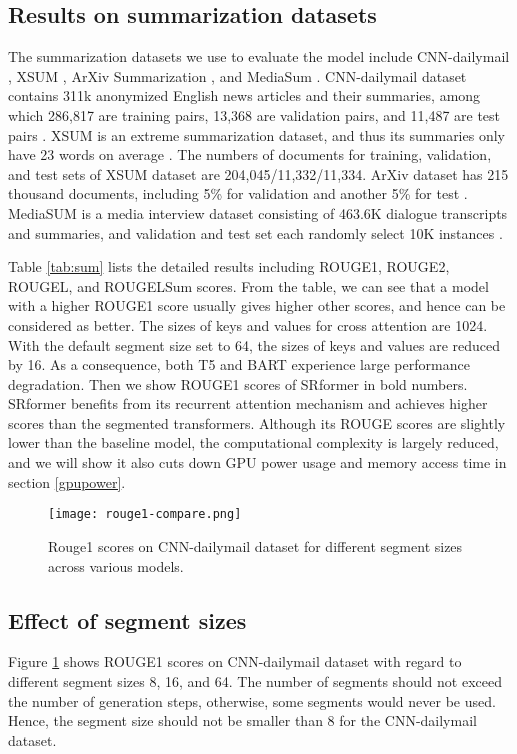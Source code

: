 \documentclass[11pt]{article}
\begin{document}
\subsection{Results on summarization datasets}
The summarization datasets we use to evaluate the model include CNN-dailymail \citep{nallapati-etal-2016-abstractive}, XSUM \citep{xsum-emnlp}, ArXiv Summarization \citep{arxiv-sum}, and MediaSum \citep{zhu-etal-2021-mediasum}. CNN-dailymail dataset contains 311k anonymized English news articles and their summaries, among which 286,817 are training pairs, 13,368 are validation pairs, and 11,487 are test pairs \citep{CNN-qa, see-etal-2017-get}. XSUM is an extreme summarization dataset, and thus its summaries only have 23 words on average \cite{xsum-emnlp}. The numbers of documents for training, validation, and test sets of XSUM dataset are 204,045/11,332/11,334. ArXiv dataset has 215 thousand documents, including 5\% for validation and another 5\% for test \cite{arxiv-sum}. MediaSUM is a media interview dataset consisting of 463.6K dialogue transcripts and summaries, and  validation and test set each randomly select 10K instances \cite{zhu-etal-2021-mediasum}.

 Table \ref{tab:sum} lists the detailed results including ROUGE1, ROUGE2, ROUGEL, and ROUGELSum scores. From the table, we can see that a model with a higher ROUGE1 score usually gives higher other scores, and hence can be considered as better. The sizes of keys and values for cross attention are 1024. With the default segment size set to 64, the sizes of keys and values are reduced by 16.  As a consequence, both T5 and BART experience large performance degradation. Then we show ROUGE1 scores of SRformer in bold numbers. SRformer benefits from its recurrent attention mechanism and achieves   higher scores than the segmented transformers. Although its ROUGE scores are slightly lower than the baseline model, the computational complexity is largely reduced, and we will show it also cuts down GPU power usage and memory access time in section \ref{gpupower}.

 \begin{figure}[htbp]
    \centering
    \texttt{[image: rouge1-compare.png]}
\caption{Rouge1 scores on CNN-dailymail dataset for different segment sizes across various models.}
    \label{fig:rouge1}
\end{figure}
\subsection{Effect of segment sizes}
Figure \ref{fig:rouge1} shows ROUGE1 scores on CNN-dailymail dataset with regard to different segment sizes 8, 16, and 64. The number of segments should not exceed the number of generation steps, otherwise, some segments would never be used. Hence, the segment size should not be smaller than 8 for the CNN-dailymail dataset.
\end{document}
